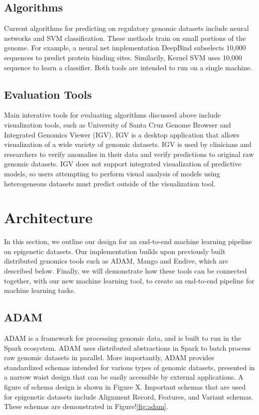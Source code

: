 \documentclass{sig-alternate-05-2015}
\begin{document}
\subsection{Algorithms}
Current algorithms for predicting on regulatory genomic datasets include neural networks and SVM classification. These methods train on small portions of the genome. For example, a neural net implementation DeepBind subselects 10,000 sequences to predict protein binding sites. Similarily, Kernel SVM uses 10,000 sequence to learn a classifier. Both tools are intended to run on a single machine. \\

\subsection{Evaluation Tools}
Main interative tools for evaluating algorithms discussed above include visualization tools, such as University of Santa Cruz Genome Browser and Integrated Genomics Viewer (IGV). IGV is a desktop application that allows visualization of a wide variety of genomic datasets. IGV is used by clinicians and researchers to verify anomalies in their data and verify predictions to original raw genomic datasets. IGV does not support integrated visualization of predictive models, so users attempting to perform visual analysis of models using heterogeneous datasets must predict outside of the visualization tool.

\section{Architecture}
In this section, we outline our design for an end-to-end machine learning pipeline on epigenetic datasets. Our implementation builds upon previously built distributed genomics tools such as ADAM, Mango and Endive, which are described below. Finally, we will demonstrate how these tools can be connected together, with our new machine learning tool, to create an end-to-end pipeline for machine learning tasks. \\

\subsection{ADAM}
ADAM is a framework for processing genomic data, and is built to run in the Spark ecosystem. ADAM uses distributed abstractions in Spark to batch process raw genomic datasets in parallel. More importantly, ADAM provides standardized schemas intended for various types of genomic datasets, presented in a narrow waist design that can be easily accessible by external applications. A figure of schema design is shown in Figure X. Important schemas that are used for epigenetic datasets include Alignment Record, Features, and Variant schemas. These schemas are demonstrated in Figure!\ref{fig:adam}. \\
\end{document}
